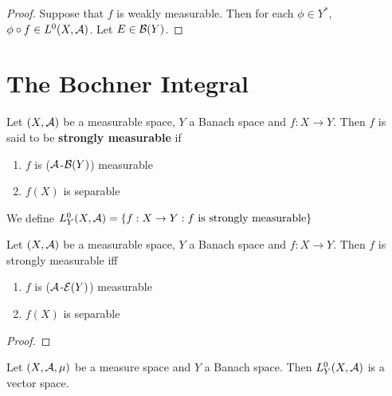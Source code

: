 \documentclass{book}
\begin{document}
\begin{proof}
	Suppose that $f$ is weakly measurable. Then for each $\phi \in Y^*$, $\phi \circ f \in L^0(X, \mathcal{A})$. Let $E \in \mathcal{B}(Y)$. 
\end{proof}
	
	
	
	
	
	
	
	
	
	
	
	
	
	
	
	
	
	
	
	
	
	
	
	
	
	\newpage
	\section{The Bochner Integral}
	
	\begin{defn}
		Let $(X, \mathcal{A})$ be a measurable space, $Y$ a Banach space and $f:X \rightarrow Y$. Then $f$ is said to be \textbf{strongly measurable} if 
		\begin{enumerate}
			\item $f$ is ($\mathcal{A}$-$\mathcal{B}(Y)$) measurable
			\item $f(X)$ is separable
		\end{enumerate}
		We define $L^0_Y(X, \mathcal{A}) = \{f:X \rightarrow Y: f \text{ is strongly measurable}\}$
	\end{defn}

	\begin{ex}
		Let $(X, \mathcal{A})$ be a measurable space, $Y$ a Banach space and $f:X \rightarrow Y$. Then $f$ is strongly measurable iff 
		\begin{enumerate}
			\item $f$ is ($\mathcal{A}$-$\mathcal{E}(Y)$) measurable
			\item $f(X)$ is separable
		\end{enumerate}
	\end{ex}

	\begin{proof}
		
	\end{proof}


	
	\begin{ex}  
	Let $(X, \mathcal{A}, \mu)$ be a measure space and $Y$ a Banach space. Then $L_Y^0(X, \mathcal{A})$ is a vector space.
	\end{ex}
	
\end{document}
